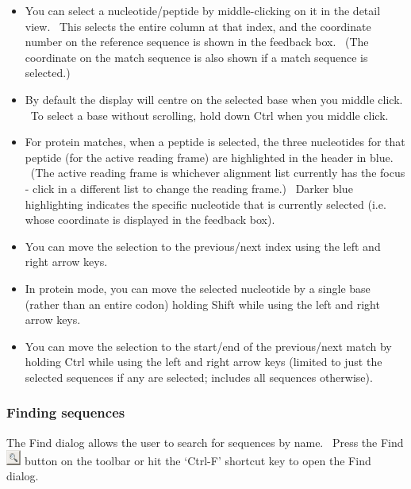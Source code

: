 \documentclass[letterpaper]{article}
\newcommand\liststyleWWviiiNumxiii{%
\renewcommand\labelitemi{{\textbullet}}
\renewcommand\labelitemii{o}
\renewcommand\labelitemiii{[F0A7?]}
\renewcommand\labelitemiv{[F0B7?]}
}
\begin{document}
\liststyleWWviiiNumxiii
\begin{itemize}
\item {
You can select a nucleotide/peptide by middle-clicking on it in the
detail view. \ This selects the entire column at that index, and the
coordinate number on the reference sequence is shown in the feedback
box. \ (The coordinate on the match sequence is also shown if a match
sequence is selected.)}
\item {
By default the display will centre on the selected base when you middle
click. \ To select a base without scrolling, hold down Ctrl when you
middle click.}
\item {
For protein matches, when a peptide is selected, the three nucleotides
for that peptide (for the active reading frame) are highlighted in the
header in blue. \ (The active reading frame is whichever alignment list
currently has the focus - click in a different list to change the
reading frame.) \ Darker blue highlighting indicates the specific
nucleotide that is currently selected (i.e. whose coordinate is
displayed in the feedback box).}
\item {
You can move the selection to the previous/next index using the left and
right arrow keys.}
\item {
In protein mode, you can move the selected nucleotide by a single base
(rather than an entire codon) holding Shift while using the left and
right arrow keys.}
\item {
You can move the selection to the start/end of the previous/next match
by holding Ctrl while using the left and right arrow keys (limited to
just the selected sequences if any are selected; includes all sequences
otherwise).}
\end{itemize}

{\color[rgb]{0.30980393,0.5058824,0.7411765}\subsubsection[Finding sequences]{Finding sequences}}
\hypertarget{RefHeading1961056909880}{}{
The Find dialog allows the user to search for sequences by name. \ Press
the Find 
\includegraphics[width=0.487cm,height=0.487cm]{img_button_find.png} 
button on the toolbar or hit the
{\textquoteleft}Ctrl-F{\textquoteright} shortcut key to open the Find
dialog.}
\end{document}
